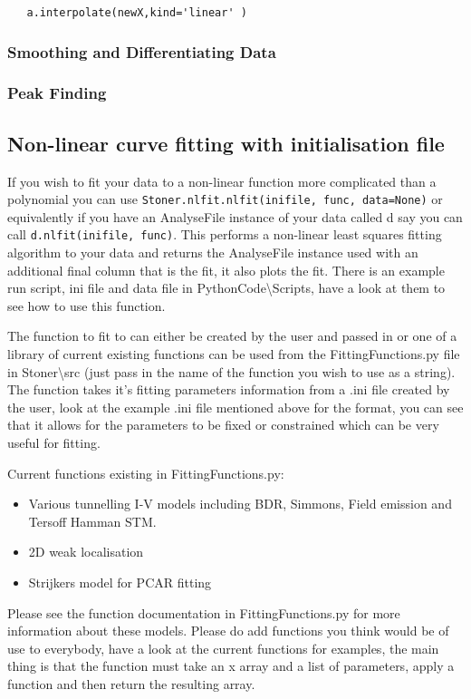 \documentclass[a4paper,11pt]{scrartcl}
\begin{document}
\begin{lstlisting}
   a.interpolate(newX,kind='linear' )
\end{lstlisting}

\subsubsection{Smoothing and Differentiating Data}

\subsubsection{Peak Finding}

\subsection{Non-linear curve fitting with initialisation file}

If you wish to fit your data to a non-linear function more complicated than a polynomial you can use \verb#Stoner.nlfit.nlfit(inifile, func, data=None)# or equivalently if you have an AnalyseFile instance of your data called d say you can call \verb#d.nlfit(inifile, func)#. This performs a non-linear least squares fitting algorithm to your data and returns the AnalyseFile instance used with an additional final column that is the fit, it also plots the fit. There is an example run script, ini file and data file in PythonCode\textbackslash Scripts, have a look at them to see how to use this function.

The function to fit to can either be created by the user and passed in or one of a library of current existing functions can be used from the FittingFunctions.py file in Stoner\textbackslash src (just pass in the name of the function you wish to use as a string). The function takes it's fitting parameters information from a .ini file created by the user, look at the example .ini file mentioned above for the format, you can see that it allows for the parameters to be fixed or constrained which can be very useful for fitting. 

Current functions existing in FittingFunctions.py:
\begin{itemize}
\item Various tunnelling I-V models including BDR, Simmons, Field emission and Tersoff Hamman STM.  
\item 2D weak localisation
\item Strijkers model for PCAR fitting
\end{itemize}
Please see the function documentation in FittingFunctions.py for more information about these models. Please do add functions you think would be of use to everybody, have a look at the current functions for examples, the main thing is that the function must take an x array and a list of parameters, apply a function and then return the resulting array.  
 
\end{document}
